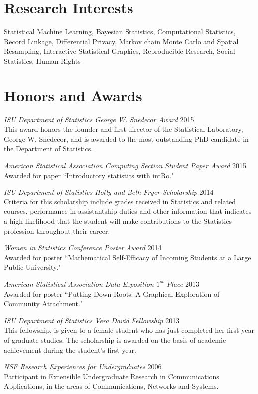 \documentclass[margin,line]{res}
\begin{document}
\begin{resume}
\section{\sc Research Interests}
Statistical Machine Learning, Bayesian Statistics, Computational Statistics, Record Linkage, Differential Privacy,  Markov chain Monte Carlo and Spatial Resampling, Interactive Statistical Graphics, Reproducible Research, Social Statistics, Human Rights

\section{\sc Honors and Awards}
{\em ISU Department of Statistics George W. Snedecor Award } \hfill 2015\\
This award honors the founder and first director of the Statistical Laboratory, George W. Snedecor, and is awarded to the most outstanding PhD candidate in the Department of Statistics.

{\em American Statistical Association Computing Section Student Paper Award } \hfill 2015 \\
Awarded for paper ``Introductory statistics with intRo."

{\em ISU Department of Statistics Holly and Beth Fryer Scholarship } \hfill 2014\\
Criteria for this scholarship include grades received in Statistics and related courses, performance in assistantship duties and other information that indicates a high likelihood that the student will make contributions to the Statistics profession throughout their career.

{\em Women in Statistics Conference Poster Award } \hfill 2014\\
Awarded for poster ``Mathematical Self-Efficacy of Incoming Students at a Large Public University."

{\em American Statistical Association Data Exposition $1^{st}$ Place } \hfill 2013\\
Awarded for poster ``Putting Down Roots: A Graphical Exploration of Community Attachment."

{\em ISU Department of Statistics Vera David Fellowship } \hfill 2013\\
This fellowship, is given to a female student who has just completed her first year of graduate studies. The scholarship is awarded on the basis of academic achievement during the student’s first year.

{\em NSF Research Experiences for Undergraduates } \hfill 2006\\
Participant in Extensible Undergraduate Research in Communications Applications, in the areas of Communications, Networks and Systems.


\end{resume}
\end{document}
